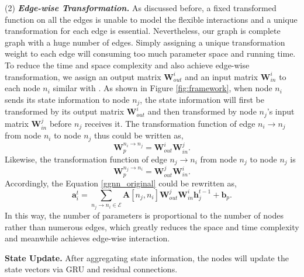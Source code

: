 \documentclass[sigconf]{acmart}
\begin{document}
(2) \textit{\textbf{Edge-wise Transformation.}}
As discussed before, a fixed transformed function on all the edges is unable to model the flexible interactions and a unique transformation for each edge is essential. 
Nevertheless, our graph is complete graph with a huge number of edges.
Simply assigning a unique transformation weight to each edge will consuming too much parameter space and running time. 
To reduce the time and space complexity and also achieve edge-wise transformation, we assign an output matrix $\mathbf{W}_{out}^{i}$ and an input matrix $\mathbf{W}_{in}^{i}$ to each node $n_{i}$ similar with \cite{cui2019dressing}.
As shown in Figure \ref{fig:framework}, when node $n_{i}$ sends its state information to node $n_{j}$, the state information will first be transformed by its output matrix $\mathbf{W}_{out}^{i}$ and then transformed by node $n_{j}$'s input matrix $\mathbf{W}_{in}^{j}$ before $n_{j}$ receives it. 
The transformation function of edge $n_{i} \rightarrow n_{j}$ from node $n_{i}$ to node $n_{j}$ thus could be written as,
\begin{equation} \label{W_inout}
\mathbf{W}_{p}^{n_{i} \rightarrow n_{j}} = \mathbf{W}_{out}^{i}\mathbf{W}_{in}^{j}.
\end{equation}
Likewise, the transformation function of edge $n_{j} \rightarrow n_{i}$ from node $n_{j}$ to node $n_{j}$ is
\begin{equation} \label{W_inout}
\mathbf{W}_{p}^{n_{j} \rightarrow n_{i}} = \mathbf{W}_{out}^{j}\mathbf{W}_{in}^{i}.
\end{equation}
Accordingly, the Equation \ref{ggnn_original} could be rewritten as, \begin{equation} \label{ggnn_1}
\mathbf{a}_{i}^{t} = \sum_{n_{j} \rightarrow n_{i} \in \mathcal{E}} \textbf{A}[n_{j}, n_{i}]\mathbf{W}_{out}^{j}\mathbf{W}_{in}^{i} \mathbf{h}_{j}^{t-1} + \mathbf{b}_{p}.
\end{equation}
In this way, the number of parameters is proportional to the number of nodes rather than numerous edges, which greatly reduces the space and time complexity and meanwhile achieves edge-wise interaction.

\noindent \textbf{State Update.}
After aggregating state information, the nodes will update the state vectors via GRU and residual connections.
\end{document}
